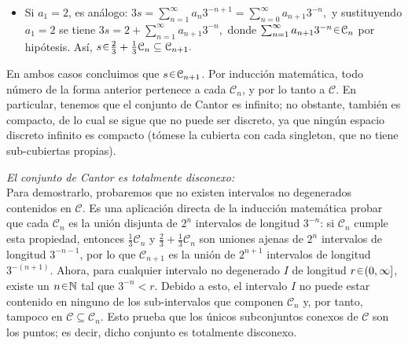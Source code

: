 \begin{sol}[Demostración]
\begin{enumerate}[label = (\alph*)]
\begin{itemize}
        \item Si $a_1 = 2$, es análogo:
        $
            3s = \sum_{n=1}^\infty a_n 3^{-n+1} 
                = \sum_{n=0}^\infty a_{n+1} 3^{-n},
        $
        y sustituyendo $a_1=2$ se tiene
        $
            3s = 2 + \sum_{n=1}^\infty a_{n+1} 3^{-n},
        $
        donde $\sum_{n=1}^\infty a_{n+1} 3^{-n} \en \mathcal{C}_n$ por hipótesis. Así,
        $
            s \en \tfrac{2}{3} + \tfrac{1}{3}\mathcal{C}_n \subseteq \mathcal{C}_{n+1}.
        $
    \end{itemize}
    En ambos casos concluimos que $s \en \mathcal{C}_{n+1}$. Por inducción matemática, todo número de la forma anterior pertenece a cada $\mathcal{C}_n$, y por lo tanto a $\mathcal{C}$. En particular, tenemos que el conjunto de Cantor es infinito; no obstante, también es compacto, de lo cual se sigue que no puede ser discreto, ya que ningún espacio discreto infinito es compacto (tómese la cubierta con cada singleton, que no tiene sub-cubiertas propias).\vspace{1em}

    \emph{El conjunto de Cantor es totalmente disconexo:}\\
    Para demostrarlo, probaremos que no existen intervalos no degenerados contenidos en $\mathcal{C}$. Es una aplicación directa de la inducción matemática probar que cada $\mathcal{C}_n$ es la unión disjunta de $2^n$ intervalos de longitud $3^{-n}$: si $\mathcal{C}_n$ cumple esta propiedad, entonces $\frac{1}{3}\mathcal{C}_n$ y $\frac{2}{3} + \frac{1}{3}\mathcal{C}_n$ son uniones ajenas de $2^n$ intervalos de longitud $3^{-n-1}$, por lo que $\mathcal{C}_{n+1}$ es la unión de $2^{n+1}$ intervalos de longitud $3^{-(n+1)}$. Ahora, para cualquier intervalo no degenerado $I$ de longitud $r \en (0, \infty]$, existe un $n \en \mathbb{N}$ tal que $3^{-n} < r$. Debido a esto, el intervalo $I$ no puede estar contenido en ninguno de los sub-intervalos que componen $\mathcal{C}_n$ y, por tanto, tampoco en $\mathcal{C} \subseteq \mathcal{C}_n$. Esto prueba que los únicos subconjuntos conexos de $\mathcal{C}$ son los puntos; es decir, dicho conjunto es totalmente disconexo.\qedhere
    \end{enumerate}
\end{sol}

